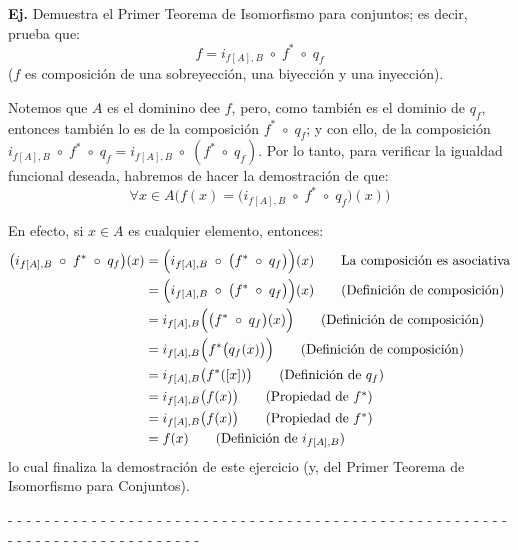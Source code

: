 \documentclass[letterpaper,DIV=14,headsepline,12pt]{scrartcl}
\makeatletter
\newcounter{Ejer}
\newcommand{\pts}{}
\newenvironment{ejercicio}[1]{\noindent
    \ifthenelse{\equal{#1}{1} \OR \equal{#1}{+1}}{\renewcommand{\pts}{\textbf{(#1 pt)}}}{\renewcommand{\pts}{\textbf{(#1 pts)}}}\textbf{Ej. \theEjer} \pts\stepcounter{Ejer}}{\vspace{.3cm}}
\renewenvironment{proof}[1][]{%
        \par\pushQED{\qed}%
        \normalfont\topsep6pt \partopsep0pt %
        \trivlist
        \item[\hskip\labelsep
                \textbf{\textit{Demostración.}}%
        ]#1
        }{%
        \popQED\endtrivlist\@endpefalse
    }
\makeatother
\begin{document}
    \begin{ejercicio}{.5}
        Demuestra el Primer Teorema de Isomorfismo para conjuntos; es decir,
        prueba que:
        \[ f=i_{f[A],B} \; \circ \; f^* \; \circ \; q_f \] ($f$ es composición
        de una sobreyección, una biyección y una inyección).
    \end{ejercicio}
    \begin{proof}
        Notemos que $A$ es el dominino dee $f$, pero, como también es el dominio de $q_f$, entonces también lo es de la composición $f^* \; \circ \; q_f$; y con ello, de la composición $i_{f[A],B} \; \circ \; f^* \; \circ \; q_f = i_{f[A],B} \; \circ \; (f^* \; \circ \; q_f)$. Por lo tanto, para verificar la igualdad funcional deseada, habremos de hacer la demostración de que:
        \[ \forall x \in A \Big( f(x) = \big( i_{f[A],B} \; \circ \; f^* \; \circ \; q_f \big) (x) \Big) \]

        En efecto, si $x \in A$ es cualquier elemento, entonces:
        \begin{align*}
            \big( i_{f[A],B} \; \circ \; f^* \; \circ \; q_f \big) (x) & = \Big( i_{f[A],B} \; \circ \; \big( f^* \; \circ \; q_f\big) \Big) (x) \tag*{La composición es asociativa} \\
            & = \Big( i_{f[A],B} \; \circ \; \big( f^* \; \circ \; q_f\big) \Big) (x) \tag*{(Definición de composición)} \\
            & = i_{f[A],B} \Big( \big( f^* \; \circ \; q_f\big) (x) \Big) \tag*{(Definición de composición)} \\
            & = i_{f[A],B} \Big( f^* \big(  q_f (x) \big) \Big) \tag*{(Definición de composición)} \\
            & = i_{f[A],B} \big( f^* (  [x] ) \big) \tag*{(Definición de $q_f$)} \\
            & = i_{f[A],B} \big( f(x) \big) \tag*{(Propiedad de $f^*$)} \\
            & = i_{f[A],B} \big( f(x) \big) \tag*{(Propiedad de $f^*$)} \\
            & = f(x) \tag*{(Definición de $i_{f[A],B}$)}
        \end{align*}
        lo cual finaliza la demostración de este ejercicio (y, del Primer Teorema de Isomorfismo para Conjuntos).
    \end{proof}

    \begin{center}
        - - - - - - - - - - - - - - - - - - - - - - - - - - - - - - - - - - - - - - - - - - - - - - - - - - - - - - - - - - - - - - - - - - - - - - - - - - -
    \end{center}
\end{document}
